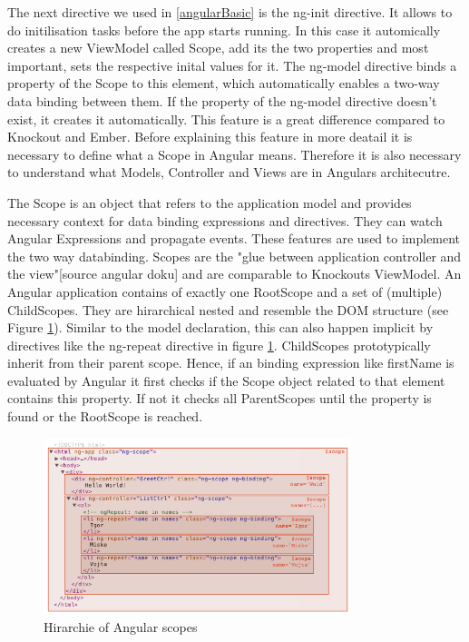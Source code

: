 The next directive we used in \ref{angularBasic} is the ng-init directive. It allows to do initilisation tasks before the app starts running. In this case it automically creates a new ViewModel called Scope, add its the two properties and most important, sets the respective inital values for it. The ng-model directive binds a property of the Scope to this element, which automatically enables a two-way data binding between them. If the property of the ng-model directive doesn't exist, it creates it automatically. This feature is a great difference compared to Knockout and Ember. Before explaining this feature in more deatail it is necessary to define what a Scope in Angular means. Therefore it is also necessary to understand what Models, Controller and Views are in Angulars architecutre.


The Scope is an object that refers to the application model and provides necessary context for data binding expressions and directives. They can watch Angular Expressions and propagate events. These features are used to implement the two way databinding. Scopes are the "glue between application controller and the view"[source angular doku] and are comparable to Knockouts ViewModel. An Angular application contains of exactly one RootScope and a set of (multiple)  ChildScopes. They are hirarchical nested and resemble the DOM structure (see Figure \ref{fig:angular_scopes}). Similar to the model declaration, this can also happen implicit by directives like the ng-repeat directive in figure \ref{fig:angular_scopes}. ChildScopes prototypically inherit from their parent scope. Hence, if an binding expression like {{firstName}} is evaluated by Angular it first checks if the Scope object related to that element contains this property. If not it checks all ParentScopes until the property is found or the RootScope is reached.

\begin{figure}
	\centering	
	\includegraphics[width=0.8\textwidth]{./img/angular_scopes.png}
	\caption{Hirarchie of Angular scopes}
	\label{fig:angular_scopes}
\end{figure} 

